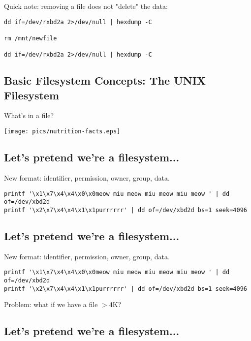 \documentclass[xga]{xdvislides}
\begin{document}
Quick note: removing a file does not "delete" the
data:
\begin{verbatim}
dd if=/dev/rxbd2a 2>/dev/null | hexdump -C

rm /mnt/newfile

dd if=/dev/rxbd2a 2>/dev/null | hexdump -C
\end{verbatim}



\subsection{Basic Filesystem Concepts: The UNIX Filesystem}
What's in a file?
\vspace*{\fill}
\begin{center}
\texttt{[image: pics/nutrition-facts.eps]} \\
\end{center}
\vspace*{\fill}

\subsection{Let's pretend we're a filesystem...}

New format: identifier, permission, owner, group, data.
\begin{verbatim}
printf '\x1\x7\x4\x4\x0\x0meow miu meow miu meow miu meow ' | dd of=/dev/xbd2d
printf '\x2\x7\x4\x4\x1\x1purrrrrr' | dd of=/dev/xbd2d bs=1 seek=4096
\end{verbatim}

\subsection{Let's pretend we're a filesystem...}

New format: identifier, permission, owner, group, data.
\begin{verbatim}
printf '\x1\x7\x4\x4\x0\x0meow miu meow miu meow miu meow ' | dd of=/dev/xbd2d
printf '\x2\x7\x4\x4\x1\x1purrrrrr' | dd of=/dev/xbd2d bs=1 seek=4096
\end{verbatim}
\vspace{.5in}
Problem: what if we have a file $>$4K?

\subsection{Let's pretend we're a filesystem...}
\end{document}

